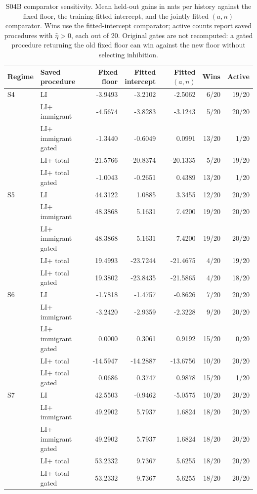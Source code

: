 \begin{table}[H]\centering\small
\setlength{\tabcolsep}{3pt}
\caption{S04B comparator sensitivity. Mean held-out gains in nats per history against the fixed floor, the training-fitted intercept, and the jointly fitted $(a,n)$ comparator. Wins use the fitted-intercept comparator; active counts report saved procedures with $\hat\eta>0$, each out of 20. Original gates are not recomputed: a gated procedure returning the old fixed floor can win against the new floor without selecting inhibition.}\label{tab:s04b-refitted-floor}
\begin{tabular}{@{}llrrrrr@{}}
\toprule Regime & Saved procedure & \shortstack{Fixed\\floor} & \shortstack{Fitted\\intercept} & \shortstack{Fitted\\$(a,n)$} & Wins & Active\\\midrule
S4 & LI & -3.9493 & -3.2102 & -2.5062 & 6/20 & 19/20\\
 & LI+ immigrant & -4.5674 & -3.8283 & -3.1243 & 5/20 & 20/20\\
 & LI+ immigrant gated & -1.3440 & -0.6049 & 0.0991 & 13/20 & 1/20\\
 & LI+ total & -21.5766 & -20.8374 & -20.1335 & 5/20 & 19/20\\
 & LI+ total gated & -1.0043 & -0.2651 & 0.4389 & 13/20 & 1/20\\
\addlinespace
S5 & LI & 44.3122 & 1.0885 & 3.3455 & 12/20 & 20/20\\
 & LI+ immigrant & 48.3868 & 5.1631 & 7.4200 & 19/20 & 20/20\\
 & LI+ immigrant gated & 48.3868 & 5.1631 & 7.4200 & 19/20 & 20/20\\
 & LI+ total & 19.4993 & -23.7244 & -21.4675 & 4/20 & 19/20\\
 & LI+ total gated & 19.3802 & -23.8435 & -21.5865 & 4/20 & 18/20\\
\addlinespace
S6 & LI & -1.7818 & -1.4757 & -0.8626 & 7/20 & 20/20\\
 & LI+ immigrant & -3.2420 & -2.9359 & -2.3228 & 9/20 & 20/20\\
 & LI+ immigrant gated & 0.0000 & 0.3061 & 0.9192 & 15/20 & 0/20\\
 & LI+ total & -14.5947 & -14.2887 & -13.6756 & 10/20 & 20/20\\
 & LI+ total gated & 0.0686 & 0.3747 & 0.9878 & 15/20 & 1/20\\
\addlinespace
S7 & LI & 42.5503 & -0.9462 & -5.0575 & 10/20 & 20/20\\
 & LI+ immigrant & 49.2902 & 5.7937 & 1.6824 & 18/20 & 20/20\\
 & LI+ immigrant gated & 49.2902 & 5.7937 & 1.6824 & 18/20 & 20/20\\
 & LI+ total & 53.2332 & 9.7367 & 5.6255 & 18/20 & 20/20\\
 & LI+ total gated & 53.2332 & 9.7367 & 5.6255 & 18/20 & 20/20\\
\bottomrule\end{tabular}\end{table}

